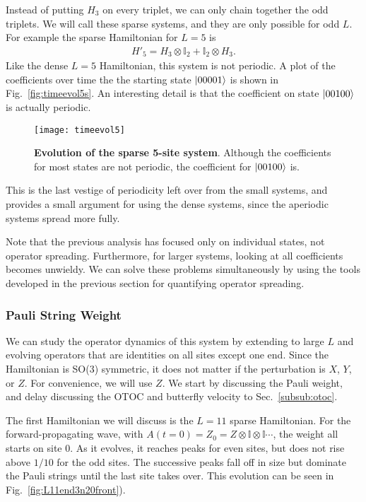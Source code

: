 Instead of putting $H_3$ on every triplet, we can only chain together the odd triplets. We will call these sparse systems, and they are only possible for odd $L$. For example the sparse Hamiltonian for $L=5$ is
\begin{align}
H'_5 = H_3\otimes\mathbb{I}_2 + \mathbb{I}_2\otimes H_3.
\end{align}
Like the dense $L=5$ Hamiltonian, this system is not periodic. A plot of the coefficients over time the the starting state $\left|00001\right\rangle$ is shown in Fig.~\ref{fig:timeevol5s}. An interesting detail is that the coefficient on state $\left|00100\right\rangle$ is actually periodic. 
\begin{figure}
	\centering
	\texttt{[image: timeevol5]}
	\caption{\textbf{Evolution of the sparse 5-site system}. Although the coefficients for most states are not periodic, the coefficient for $\left|00100\right\rangle$ is.}
\end{figure} 
This is the last vestige of periodicity left over from the small systems, and provides a small argument for using the dense systems, since the aperiodic systems spread more fully.

Note that the previous analysis has focused only on individual states, not operator spreading. Furthermore, for larger systems, looking at all coefficients becomes unwieldy. We can solve these problems simultaneously by using the tools developed in the previous section for quantifying operator spreading.

\subsubsection{Pauli String Weight} \label{subsub:pauli}  

We can study the operator dynamics of this system by extending to large $L$ and evolving operators that are identities on all sites except one end. Since the Hamiltonian is SO(3) symmetric, it does not matter if the perturbation is $X$, $Y$, or $Z$. For convenience, we will use $Z$. We start by discussing the Pauli weight, and delay discussing the OTOC and butterfly velocity to Sec.~\ref{subsub:otoc}.

The first Hamiltonian we will discuss is the $L=11$ sparse Hamiltonian.
For the forward-propagating wave, with $A(t=0) = Z_0 = Z\otimes \mathbb{I} \otimes \mathbb{I} \cdots$, the weight all starts on site 0. As it evolves, it reaches peaks for even sites, but does not rise above $1/10$ for the odd sites. The successive peaks fall off in size but dominate the Pauli strings until the last site takes over. This evolution can be seen in Fig.~\ref{fig:L11end3n20front}). 

